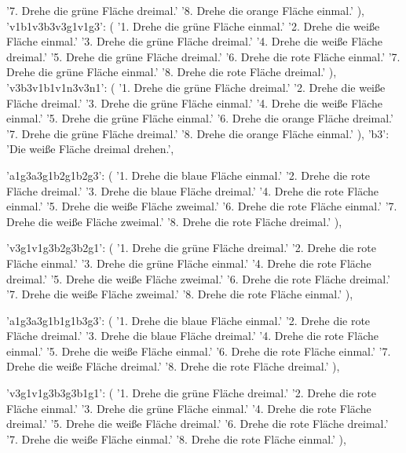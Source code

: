 {{            '7. Drehe die grüne Fläche dreimal.\n'
            '8. Drehe die orange Fläche einmal.'
        ),
        'v1b1v3b3v3g1v1g3': (
            '1. Drehe die grüne Fläche einmal.\n'
            '2. Drehe die weiße Fläche einmal.\n'
            '3. Drehe die grüne Fläche dreimal.\n'
            '4. Drehe die weiße Fläche dreimal.\n'
            '5. Drehe die grüne Fläche dreimal.\n'
            '6. Drehe die rote Fläche einmal.\n'
            '7. Drehe die grüne Fläche einmal.\n'
            '8. Drehe die rote Fläche dreimal.'
        ),
        'v3b3v1b1v1n3v3n1': (
            '1. Drehe die grüne Fläche dreimal.\n'
            '2. Drehe die weiße Fläche dreimal.\n'
            '3. Drehe die grüne Fläche einmal.\n'
            '4. Drehe die weiße Fläche einmal.\n'
            '5. Drehe die grüne Fläche einmal.\n'
            '6. Drehe die orange Fläche dreimal.\n'
            '7. Drehe die grüne Fläche dreimal.\n'
            '8. Drehe die orange Fläche einmal.'
        ),
        'b3': 'Die weiße Fläche dreimal drehen.',
        
        'a1g3a3g1b2g1b2g3': (
            '1. Drehe die blaue Fläche einmal.\n'
            '2. Drehe die rote Fläche dreimal.\n'
            '3. Drehe die blaue Fläche dreimal.\n'
            '4. Drehe die rote Fläche einmal.\n'
            '5. Drehe die weiße Fläche zweimal.\n'
            '6. Drehe die rote Fläche einmal.\n'
            '7. Drehe die weiße Fläche zweimal.\n'
            '8. Drehe die rote Fläche dreimal.'
        ),

        'v3g1v1g3b2g3b2g1': (
            '1. Drehe die grüne Fläche dreimal.\n'
            '2. Drehe die rote Fläche einmal.\n'
            '3. Drehe die grüne Fläche einmal.\n'
            '4. Drehe die rote Fläche dreimal.\n'
            '5. Drehe die weiße Fläche zweimal.\n'
            '6. Drehe die rote Fläche dreimal.\n'
            '7. Drehe die weiße Fläche zweimal.\n'
            '8. Drehe die rote Fläche einmal.'
        ),

        'a1g3a3g1b1g1b3g3': (
            '1. Drehe die blaue Fläche einmal.\n'
            '2. Drehe die rote Fläche dreimal.\n'
            '3. Drehe die blaue Fläche dreimal.\n'
            '4. Drehe die rote Fläche einmal.\n'
            '5. Drehe die weiße Fläche einmal.\n'
            '6. Drehe die rote Fläche einmal.\n'
            '7. Drehe die weiße Fläche dreimal.\n'
            '8. Drehe die rote Fläche dreimal.'
        ),

        'v3g1v1g3b3g3b1g1': (
            '1. Drehe die grüne Fläche dreimal.\n'
            '2. Drehe die rote Fläche einmal.\n'
            '3. Drehe die grüne Fläche einmal.\n'
            '4. Drehe die rote Fläche dreimal.\n'
            '5. Drehe die weiße Fläche dreimal.\n'
            '6. Drehe die rote Fläche dreimal.\n'
            '7. Drehe die weiße Fläche einmal.\n'
            '8. Drehe die rote Fläche einmal.'
        ),

}}
